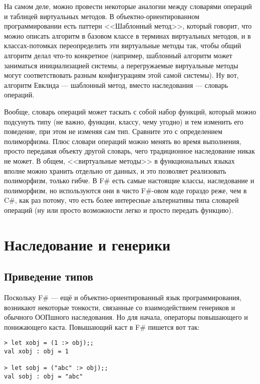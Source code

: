 \documentclass[a5paper]{article}
\begin{document}
На самом деле, можно провести некоторые аналогии между словарями операций и таблицей виртуальных методов. В объектно-ориентированном программировании есть паттерн <<Шаблонный метод>>, который говорит, что можно описать алгоритм в базовом классе в терминах виртуальных методов, и в классах-потомках переопределить эти виртуальные методы так, чтобы общий алгоритм делал что-то конкретное (например, шаблонный алгоритм может заниматься инициализацией системы, а перегружаемые виртуальные методы могут соответствовать разным конфигурациям этой самой системы). Ну вот, алгоритм Евклида --- шаблонный метод, вместо наследования --- словарь операций. 

Вообще, словарь операций может таскать с собой набор функций, который можно подсунуть типу (не важно, функции, классу, чему угодно) и тем изменить его поведение, при этом не изменяя сам тип. Сравните это с определением полиморфизма. Плюс словари операций можно менять во время выполнения, просто передавая объекту другой словарь, чего традиционное наследование никак не может. В общем, <<виртуальные методы>> в функциональных языках вполне можно хранить отдельно от данных, и это позволяет реализовать полиморфизм, только гибче. В F\# есть самые настоящие классы, наследование и полиморфизм, но используются они в чисто F\#-овом коде гораздо реже, чем в C\#, как раз потому, что есть более интересные альтернативы типа словарей операций (ну или просто возможности легко и просто передать функцию).

\section{Наследование и генерики}

\subsection{Приведение типов}

Поскольку F\# --- ещё и объектно-ориентированный язык программирования, возникают некоторые тонкости, связанные со взаимодействием генериков и обычного ООПшного наследования. Но для начала, операторы повышающего и понижающего каста. Повышающий каст в F\# пишется вот так:

\begin{verbatim}
> let xobj = (1 :> obj);;
val xobj : obj = 1

> let sobj = ("abc" :> obj);;
val sobj : obj = "abc"
\end{verbatim}
\end{document}
